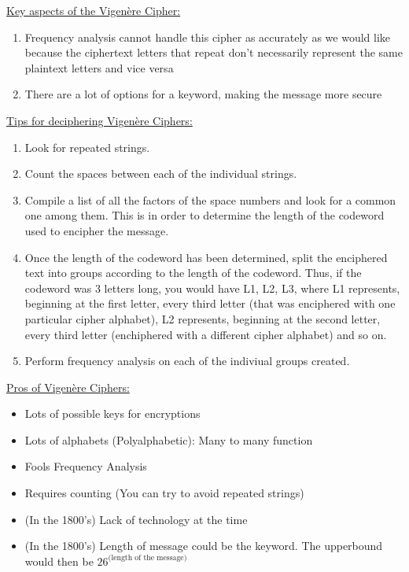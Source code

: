 \underline{Key aspects of the Vigen\`ere Cipher:}
\begin{enumerate}
\item Frequency analysis cannot handle this cipher as accurately as we would like because the ciphertext letters that repeat don't necessarily represent the same plaintext letters and vice versa
\item There are a lot of options for a keyword, making the message more secure
\end{enumerate}

\underline{Tips for deciphering Vigen\`ere Ciphers:}
\begin{enumerate}
\item Look for repeated strings.
\item Count the spaces between each of the individual strings.
\item Compile a list of all the factors of the space numbers and look for a common one among them.  This is in order to determine the length of the codeword used to encipher the message.
\item Once the length of the codeword has been determined, split the enciphered text into groups according to the length of the codeword.  Thus, if the codeword was 3 letters long, you would have L1, L2, L3, where L1 represents, beginning at the first letter, every third letter (that was enciphered with one particular cipher alphabet), L2 represents, beginning at the second letter, every third letter (enchiphered with a different cipher alphabet) and so on.
\item Perform frequency analysis on each of the indiviual groups created.
\end{enumerate}

\underline{Pros of Vigen\`ere Ciphers:}
\begin{itemize}
\item Lots of possible keys for encryptions
\item Lots of alphabets (Polyalphabetic): Many to many function
\item Fools Frequency Analysis
\item Requires counting (You can try to avoid repeated strings)
\item (In the 1800's) Lack of technology at the time
\item (In the 1800's) Length of message could be the keyword.  The upperbound would then be $26^\text{(length of the message)}$
\end{itemize}

